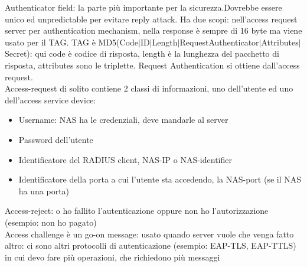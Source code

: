 \documentclass[16px]{article}
\begin{document}
Authenticator field: la parte più importante per la sicurezza.Dovrebbe essere unico ed unpredictable per evitare reply attack. Ha due scopi: nell'access request server per authentication mechanism, nella response è sempre di 16 byte ma viene usato per il TAG. TAG è MD5(Code$|$ID$|$Length$|$RequestAuthenticator$|$Attributes$|$Secret): qui code è codice di risposta, length è la lunghezza del pacchetto di risposta, attributes sono le triplette. Request Authentication si ottiene dall'access request.\\ Access-request di solito contiene 2 classi di informazioni, uno dell'utente ed uno dell'access service device:
\begin{itemize}
\item Username: NAS ha le credenziali, deve mandarle al server
\item Password dell'utente
\item Identificatore del RADIUS client, NAS-IP o NAS-identifier
\item Identificatore della porta a cui l'utente sta accedendo, la NAS-port (se il NAS ha una porta)
\end{itemize}
Access-reject: o ho fallito l'autenticazione oppure non ho l'autorizzazione (esempio: non ho pagato)\\
Access challenge è un go-on message: usato quando server vuole che venga fatto altro: ci sono altri protocolli di autenticazione (esempio: EAP-TLS, EAP-TTLS) in cui devo fare più operazioni, che richiedono più messaggi
\end{document}
